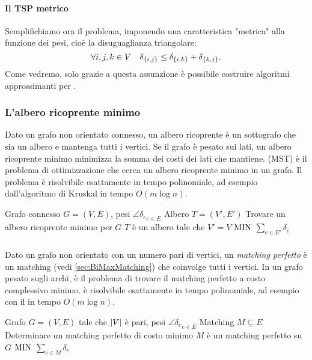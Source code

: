 \paragraph{Il TSP metrico} Semplifichiamo ora il problema, imponendo una caratteristica "metrica" alla funzione dei pesi, cioè la disuguaglianza triangolare:
\begin{equation*}
	\forall i,j,k\in V \quad \delta_{\left\{ i,j \right\}} \leq \delta_{\left\{ i,k \right\}} + \delta_{\left\{ k,j \right\}} \text.
\end{equation*}
Come vedremo, solo grazie a questa assunzione è possibile costruire algoritmi approssimanti per \TravelingSalesman.

\subsubsection{L'albero ricoprente minimo}
Dato un grafo non orientato connesso, un albero ricoprente è un sottografo che sia un albero e mantenga tutti i vertici.
Se il grafo è pesato sui lati, un albero ricoprente minimo minimizza la somma dei costi dei lati che mantiene.
\MinimumSpanningTree (MST) è il problema di ottimizzazione che cerca un albero ricoprente minimo in un grafo.
Il problema è risolvibile esattamente in tempo polinomiale, ad esempio dall'algoritmo di Kruskal in tempo $O(m\log n)$.

\popt{\MinimumSpanningTree}
{Grafo connesso $G=(V,E)$, pesi $\angle{\delta_e}_{e\in E}$}
{Albero $T=(V',E')$}
{Trovare un albero ricoprente minimo per $G$}
{$T$ è un albero tale che $V'=V$}
{$\mathrm{MIN}$}
{$\sum_{e\in E'} \delta_e$}

\subsubsection{\MinimumWeightPerfectMatching}
Dato un grafo non orientato con un numero pari di vertici, un \emph{matching perfetto} è un matching (vedi \ref{sec:BiMaxMatching}) che coinvolge tutti i vertici.
In un grafo pesato sugli archi, \MinimumWeightPerfectMatching è il problema di trovare il matching perfetto a costo complessivo minimo.
\MinimumWeightPerfectMatching è risolvibile esattamente in tempo polinomiale, ad esempio con il  in tempo $O(m\log n)$.

\popt{\MinimumWeightPerfectMatching}
{Grafo $G=(V,E)$ tale che $| V |$ è pari, pesi $\angle{\delta_e}_{e\in E}$}
{Matching $M\subseteq E$}
{Determinare un matching perfetto di costo minimo}
{$M$ è un matching perfetto su $G$}
{$\mathrm{MIN}$}
{$\sum_{e\in M} \delta_e$}


